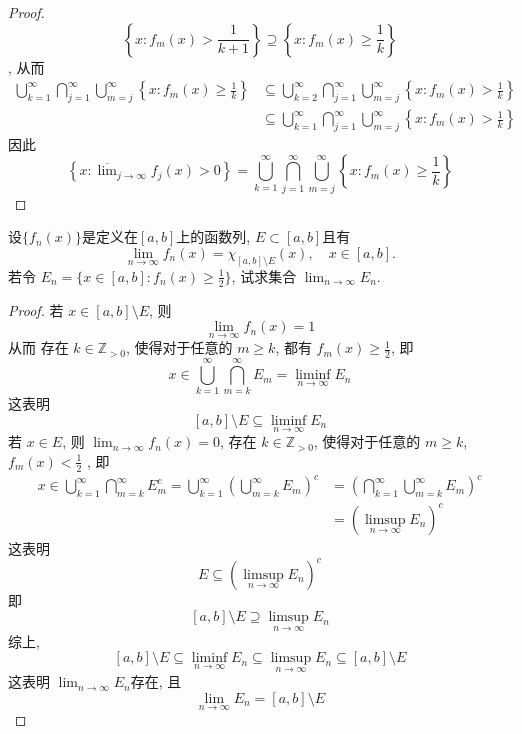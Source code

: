 \documentclass[../main.tex]{subfiles}
\begin{document}
\begin{proof}
\[    \left\{ x:f_{m}\left( x \right)> \frac{1 }{k+ 1 }   \right\}\supseteq \left\{ x:f_{m}\left( x \right)\ge \frac{1 }{k}   \right\}
     \], 从而 \[
    \begin{aligned}
     \bigcup _{k= 1}^{\infty}\bigcap_{j= 1}^{\infty}\bigcup _{m= j}^{\infty}\left\{ x:f_{m}\left( x \right)\ge  \frac{1 }{k }   \right\}& \subseteq \bigcup _{k= 2}^{\infty}\bigcap_{j= 1}^{\infty}\bigcup _{m= j}^{\infty}\left\{ x:f_{m}\left( x \right)>  \frac{1 }{k }   \right\}  \\ 
      & \subseteq \bigcup _{k= 1}^{\infty}\bigcap_{j= 1}^{\infty}\bigcup _{m= j}^{\infty}\left\{ x:f_{m}\left( x \right)> \frac{1 }{k }   \right\} 
    \end{aligned}
     \]因此\[
     \left\{ x: \overline{\lim}_{j\to \infty}f_{j}\left( x \right)> 0  \right\}= \bigcup _{k= 1}^{\infty}\bigcap_{j= 1}^{\infty}\bigcup _{m= j}^{\infty}\left\{ x:f_{m}\left( x \right)\ge  \frac{1 }{k }   \right\} 
     \]
\end{proof}
\begin{exercise}{}{}
设$\{f_n(x)\}$是定义在$[a,b]$上的函数列, $E\subset [a,b]$且有
\[\lim_{n\to\infty}f_n(x) = \chi_{[a,b]\setminus E}(x), \quad x\in [a,b].\]
若令 $E_n = \{x\in [a,b]: f_n(x)\ge \frac{1}{2}\}$, 试求集合 $\lim_{n\to\infty} E_n$.
\end{exercise}
\begin{proof}
   若 \(  x \in [a,b]\setminus E  \), 则 \[
   \lim_{n\to \infty}f_{n}\left( x \right)= 1
   \]从而 存在 \(  k \in \mathbb{Z} _{> 0}  \), 使得对于任意的 \(  m\ge k  \), 都有 \(  f_{m}\left( x \right)\ge  \frac{1 }{2 }    \), 即 \[
   x \in \bigcup _{k = 1}^{\infty}\bigcap_{m = k}^{\infty}E_{m}=  \liminf_{n\to \infty}E_{n} 
   \]   这表明 \[
   [a,b]\setminus E\subseteq  \liminf_{n\to \infty}E_{n}
   \] 若 \(  x \in E  \), 则 \(  \lim_{n\to \infty}f_{n}\left( x \right)= 0   \), 存在 \(  k \in \mathbb{Z} _{> 0}  \), 使得对于任意的 \(  m\ge k  \), \(  f_{m}\left( x \right)< \frac{1 }{2 }    \)     , 即 \[
   \begin{aligned}
    x\in \bigcup _{k= 1}^{\infty}\bigcap_{m= k}^{\infty}E_{m}^{c}=  \bigcup _{k = 1}^{\infty}\left( \bigcup _{m = k}^{\infty}E_{m} \right)^{c}&= \left( \bigcap_{k= 1}^{\infty}\bigcup _{m= k}^{\infty}E_{m}  \right)^{c}    \\ 
     &=\left(  \limsup_{n\to \infty}E_{n} \right)^{c} 
   \end{aligned}
   \]这表明 \[
   E\subseteq \left( \limsup_{n\to \infty}E_{n} \right)^{c} 
   \]即 \[
   [a,b]\setminus E\supseteq \limsup_{n\to \infty}E_{n}
   \]综上, \[
   \left[ a,b \right]\setminus E \subseteq \liminf_{n\to \infty}E_{n}\subseteq \limsup_{n\to \infty}E_{n}\subseteq \left[ a,b \right]\setminus E 
   \]这表明 \(  \lim_{n\to \infty}E_{n}  \)存在, 且 \[
   \lim_{n\to \infty}E_{n}= \left[ a,b \right]\setminus E 
   \] 
\end{proof}
\end{document}
